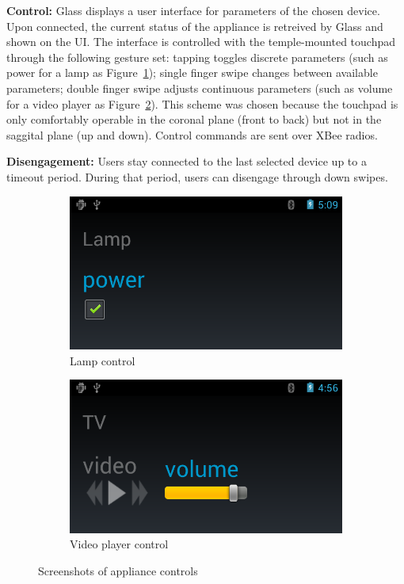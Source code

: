 {\bf Control:} Glass displays a user interface for parameters of the chosen device. Upon connected, the current status of the appliance is retreived by Glass and shown on the UI. The interface is controlled with the temple-mounted touchpad through the following gesture set: tapping toggles discrete parameters (such as power for a lamp as Figure~\ref{fig:control_lamp}); single finger swipe changes between available parameters; double finger swipe adjusts continuous parameters (such as volume for a video player as Figure~\ref{fig:control_tv}). This scheme was chosen because the touchpad is only comfortably operable in the coronal plane (front to back) but not in the saggital plane (up and down). 
Control commands are sent over XBee radios.

{\bf Disengagement:} Users stay connected to the last selected device up to a timeout period. During that period, users can disengage through down swipes.

\begin{figure}
\centering
\begin{subfigure}{.5\columnwidth}
  \centering
  \includegraphics[width=0.9\columnwidth]{figures/screenshot_LAMP_CONTROL.png}
  \caption{Lamp control}
  \label{fig:control_lamp}
\end{subfigure}%
\begin{subfigure}{.5\columnwidth}
  \centering
  \includegraphics[width=0.9\columnwidth]{figures/screenshot_TV_CONTROLS.png}
  \caption{Video player control}
  \label{fig:control_tv}
\end{subfigure}
\caption{Screenshots of appliance controls}
\label{fig:test}
\end{figure}


